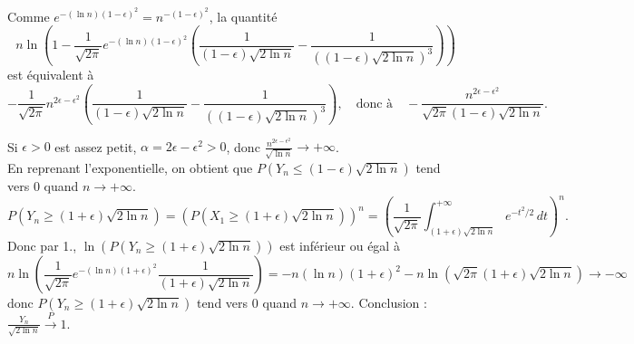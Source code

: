 {\begin{enumerate}
{Comme $e^{-(\ln n)(1-\epsilon)^2}=n^{-(1-\epsilon)^2}$, la quantité
$$
n\ln\left(1-\frac{1}{\sqrt{2\pi}}e^{-(\ln n)(1-\epsilon)^2}
\left(\frac{1}{(1-\epsilon)\sqrt{2\ln n}}-\frac{1}{((1-\epsilon)\sqrt{2\ln n})^3}
\right)\right)$$ est équivalent à
$$-\frac{1}{\sqrt{2\pi}} n^{2\epsilon-\epsilon^2}
\left(\frac{1}{(1-\epsilon)\sqrt{2\ln n}}-\frac{1}{((1-\epsilon)\sqrt{2\ln n})^3}
\right),\quad \mbox{donc à}\quad \displaystyle -\frac{n^{2\epsilon-\epsilon^2}}{\sqrt{2\pi}(1-\epsilon)
\sqrt{2\ln n}} .$$

Si $\epsilon>0$ est assez petit, $\alpha=2\epsilon-\epsilon^2>0$, donc
$\displaystyle \frac{n^{2\epsilon-\epsilon^2}}{\sqrt{\ln n}}\to +\infty$. \\
En reprenant l'exponentielle, on obtient que
$P(Y_n\leq (1-\epsilon)\sqrt{2\ln n})$ tend vers $0$ quand $n\to +\infty$.
$$
P(Y_n\geq (1+\epsilon)\sqrt{2\ln n})=(P(X_1\geq (1+\epsilon)\sqrt{2\ln n}))^n
=\left(\frac{1}{\sqrt{2\pi}}\int_{(1+\epsilon)\sqrt{2\ln n}}^{+\infty}
e^{-t^2/2}\,dt\right)^n.$$ 
Donc par 1., 
$\displaystyle\ln (P(Y_n\geq (1+\epsilon)\sqrt{2\ln n}))$ est inférieur ou égal à
$$
n\ln\left(\frac{1}{\sqrt{2\pi}}e^{-(\ln n)(1+\epsilon)^2}\frac{1}{(1+\epsilon)
\sqrt{2\ln n}}\right)=-n (\ln n)(1+\epsilon)^2-n\ln(\sqrt{2\pi}(1+\epsilon)\sqrt{2\ln n})
\to -\infty$$
donc $\displaystyle P(Y_n\geq (1+\epsilon)\sqrt{2\ln n})$
tend vers $0$ quand $n\to +\infty$. Conclusion :
$\displaystyle\frac{Y_n}{\sqrt{2\ln n}}\stackrel{P}{\longrightarrow}1$.}
\end{enumerate}
}